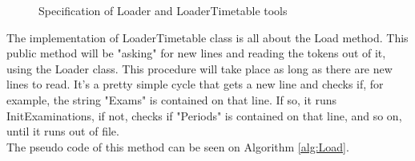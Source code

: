 \begin{figure}[t!]
\centering
{}

\caption{Specification of Loader and LoaderTimetable tools} \label{fig:Loaders}
\end{figure}

The implementation of LoaderTimetable class is all about the Load method. This public method will be "asking" for new lines and reading the tokens out of it, using the Loader class. This procedure will take place as long as there are new lines to read. It's a pretty simple cycle that gets a new line and checks if, for example, the string "Exams" is contained on that line. If so, it runs InitExaminations, if not, checks if "Periods" is contained on that line, and so on, until it runs out of file.\\

The pseudo code of this method can be seen on Algorithm \ref{alg:Load}.


